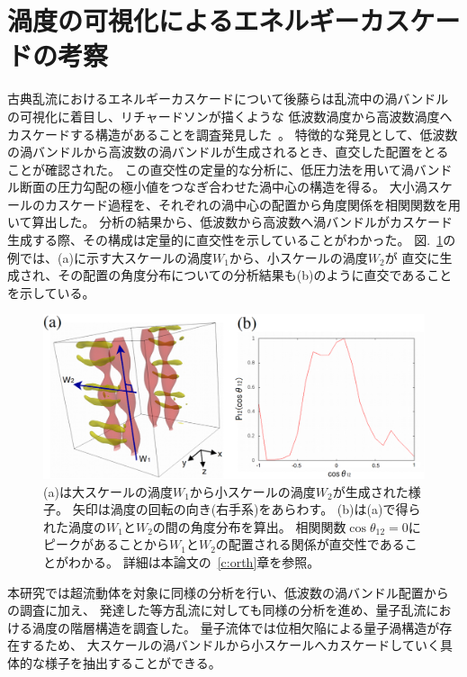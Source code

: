 \documentclass[12pt,a4paper]{jbook}
\begin{document}
		\section{渦度の可視化によるエネルギーカスケードの考察}
        \label{s:orth}
		古典乱流におけるエネルギーカスケードについて後藤らは乱流中の渦バンドルの可視化に着目し、リチャードソンが描くような
        低波数渦度から高波数渦度へカスケードする構造があることを調査発見した~\cite{Goto1,Goto2,Goto3,butsuri1}。
		特徴的な発見として、低波数の渦バンドルから高波数の渦バンドルが生成されるとき、直交した配置をとることが確認された。
		この直交性の定量的な分析に、低圧力法を用いて渦バンドル断面の圧力勾配の極小値をつなぎ合わせた渦中心の構造を得る。
		大小渦スケールのカスケード過程を、それぞれの渦中心の配置から角度関係を相関関数を用いて算出した。
		分析の結果から、低波数から高波数へ渦バンドルがカスケード生成する際、その構成は定量的に直交性を示していることがわかった。
        図.~\ref{FIG:cortho}の例では、(a)に示す大スケールの渦度$W_1$から、小スケールの渦度$W_2$が
        直交に生成され、その配置の角度分布についての分析結果も(b)のように直交であることを示している。
		\begin{figure}[H]
			\centering
			\includegraphics[width=15cm]{cortho.eps}
			\caption{
                (a)は大スケールの渦度$W_1$から小スケールの渦度$W_2$が生成された様子。
                矢印は渦度の回転の向き(右手系)をあらわす。
                (b)は(a)で得られた渦度の$W_1$と$W_2$の間の角度分布を算出。
                相関関数$\cos \theta_{12}=0$にピークがあることから$W_1$と$W_2$の配置される関係が直交性であることがわかる。
                詳細は本論文の~\ref{c:orth}章を参照。
			}
			\label{FIG:cortho}
		\end{figure}
		本研究では超流動体を対象に同様の分析を行い、低波数の渦バンドル配置からの調査に加え、
        発達した等方乱流に対しても同様の分析を進め、量子乱流における渦度の階層構造を調査した。
		量子流体では位相欠陥による量子渦構造が存在するため、
		大スケールの渦バンドルから小スケールへカスケードしていく具体的な様子を抽出することができる。
\end{document}
